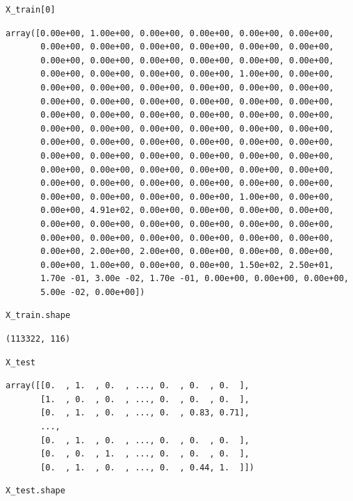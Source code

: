 \begin{verbatim}
X_train[0]
\end{verbatim}

\begin{verbatim}
array([0.00e+00, 1.00e+00, 0.00e+00, 0.00e+00, 0.00e+00, 0.00e+00,
       0.00e+00, 0.00e+00, 0.00e+00, 0.00e+00, 0.00e+00, 0.00e+00,
       0.00e+00, 0.00e+00, 0.00e+00, 0.00e+00, 0.00e+00, 0.00e+00,
       0.00e+00, 0.00e+00, 0.00e+00, 0.00e+00, 1.00e+00, 0.00e+00,
       0.00e+00, 0.00e+00, 0.00e+00, 0.00e+00, 0.00e+00, 0.00e+00,
       0.00e+00, 0.00e+00, 0.00e+00, 0.00e+00, 0.00e+00, 0.00e+00,
       0.00e+00, 0.00e+00, 0.00e+00, 0.00e+00, 0.00e+00, 0.00e+00,
       0.00e+00, 0.00e+00, 0.00e+00, 0.00e+00, 0.00e+00, 0.00e+00,
       0.00e+00, 0.00e+00, 0.00e+00, 0.00e+00, 0.00e+00, 0.00e+00,
       0.00e+00, 0.00e+00, 0.00e+00, 0.00e+00, 0.00e+00, 0.00e+00,
       0.00e+00, 0.00e+00, 0.00e+00, 0.00e+00, 0.00e+00, 0.00e+00,
       0.00e+00, 0.00e+00, 0.00e+00, 0.00e+00, 0.00e+00, 0.00e+00,
       0.00e+00, 0.00e+00, 0.00e+00, 0.00e+00, 1.00e+00, 0.00e+00,
       0.00e+00, 4.91e+02, 0.00e+00, 0.00e+00, 0.00e+00, 0.00e+00,
       0.00e+00, 0.00e+00, 0.00e+00, 0.00e+00, 0.00e+00, 0.00e+00,
       0.00e+00, 0.00e+00, 0.00e+00, 0.00e+00, 0.00e+00, 0.00e+00,
       0.00e+00, 2.00e+00, 2.00e+00, 0.00e+00, 0.00e+00, 0.00e+00,
       0.00e+00, 1.00e+00, 0.00e+00, 0.00e+00, 1.50e+02, 2.50e+01,
       1.70e -01, 3.00e -02, 1.70e -01, 0.00e+00, 0.00e+00, 0.00e+00,
       5.00e -02, 0.00e+00])
\end{verbatim}

\begin{verbatim}
X_train.shape
\end{verbatim}

\begin{verbatim}
(113322, 116)
\end{verbatim}

\begin{verbatim}
X_test
\end{verbatim}

\begin{verbatim}
array([[0.  , 1.  , 0.  , ..., 0.  , 0.  , 0.  ],
       [1.  , 0.  , 0.  , ..., 0.  , 0.  , 0.  ],
       [0.  , 1.  , 0.  , ..., 0.  , 0.83, 0.71],
       ...,
       [0.  , 1.  , 0.  , ..., 0.  , 0.  , 0.  ],
       [0.  , 0.  , 1.  , ..., 0.  , 0.  , 0.  ],
       [0.  , 1.  , 0.  , ..., 0.  , 0.44, 1.  ]])
\end{verbatim}

\begin{verbatim}
X_test.shape
\end{verbatim}

